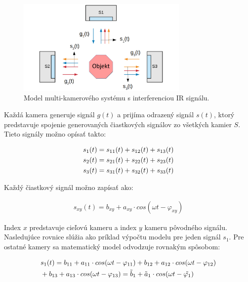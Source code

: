 \begin{figure}[H]
	\centering
	\includegraphics[width=0.74\textwidth]{figures/interference_model.png}
	\caption{Model multi-kamerového systému s interferenciou IR signálu.}
	\label{fig:imodel}
\end{figure}  

Každá kamera generuje signál $g(t)$ a prijíma odrazený signál $s(t)$, ktorý predstavuje spojenie generovaných čiastkových signálov zo všetkých kamier $S$. Tieto signály možno opísať takto:

\begin{equation}
\label{eq::tof::10}
\begin{aligned}
s_1 (t) }= {s_{11}(t)+s_{12}(t)+s_{13}(t) \\
s_2 (t) }= {s_{21}(t)+s_{22}(t)+s_{23}(t) \\
s_3 (t) }= {s_{31}(t)+s_{32}(t)+s_{33}(t) 
\end{aligned}
\end{equation}

\noindent  Každý čiastkový signál možno zapísať ako:

\begin{equation}
\label{eq::tof::11}
\begin{aligned}
s_{xy}(t) = b_{xy}+a_{xy} \cdot cos(\omega t - \varphi _{xy})
\end{aligned}
\end{equation}

Index $x$ predstavuje cieľovú kameru a index $y$ kameru pôvodného signálu. Nasledujúce rovnice slúžia ako príklad výpočtu modelu pre jeden signál $s_1$. Pre ostatné kamery sa matematický model odvodzuje rovnakým spôsobom:

\begin{equation}
\label{eq::tof::12}
\begin{aligned}
&{s_{1}(t) }= {b_{11}+a_{11} \cdot cos(\omega t - \varphi _{11}) + {b_{12} +a_{12} \cdot cos(\omega t - \varphi _{12})}} \\ 
&+ {{b_{13}+a_{13} \cdot cos(\omega t - \varphi _{13})} = \Tilde{b}_1 + \Tilde{a}_1 \cdot cos(\omega t - \Tilde{\varphi_1})}  
\end{aligned}
\end{equation}

